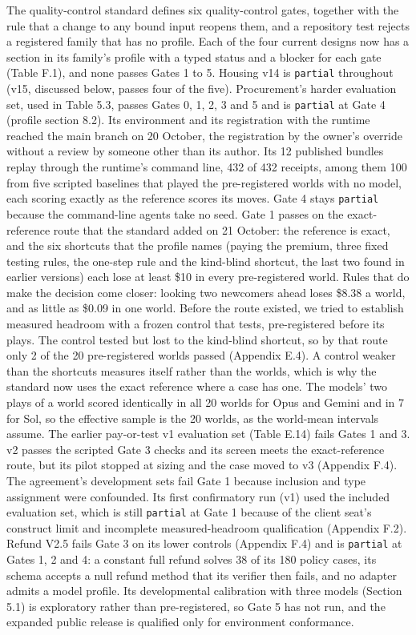 \begin{sloppypar}
The quality-control standard defines six quality-control gates, together with the rule that a change to any bound
input reopens them, and a repository test rejects a registered family that has no profile. Each of the four current
designs now has a section in its family's profile with a typed status and a blocker for each gate (Table F.1), and
none passes Gates 1 to 5. Housing v14 is \texttt{partial} throughout (v15, discussed below, passes four of the five).
Procurement's harder evaluation set, used in Table 5.3, passes Gates 0, 1, 2, 3 and 5 and is \texttt{partial} at Gate 4
(profile section 8.2). Its environment and its registration with the runtime reached the main branch on 20 October,
the registration by the owner's override without a review by someone other than its author. Its 12 published bundles
replay through the runtime's command line, 432 of 432 receipts, among them 100 from five scripted baselines that
played the pre-registered worlds with no model, each scoring exactly as the reference scores its moves. Gate 4 stays
\texttt{partial} because the command-line agents take no seed. Gate 1 passes on the exact-reference route that the standard
added on 21 October: the reference is exact, and the six shortcuts that the profile names (paying the premium, three
fixed testing rules, the one-step rule and the kind-blind shortcut, the last two found in earlier versions) each lose
at least \$10 in every pre-registered world. Rules that do make the decision come closer: looking two newcomers ahead
loses \$8.38 a world, and as little as \$0.09 in one world. Before the route existed, we tried to establish measured
headroom with a frozen control that tests, pre-registered before its plays. The control tested but lost to the
kind-blind shortcut, so by that route only 2 of the 20 pre-registered worlds passed (Appendix E.4). A control weaker
than the shortcuts measures itself rather than the worlds, which is why the standard now uses the exact reference
where a case has one. The models' two plays of a world scored identically in all 20 worlds for Opus and Gemini and in 7
for Sol, so the effective sample is the 20 worlds, as the world-mean intervals assume. The earlier pay-or-test v1
evaluation set (Table E.14) fails Gates 1 and 3. v2 passes the scripted Gate 3 checks and its screen meets the
exact-reference route, but its pilot stopped at sizing and the case moved to v3 (Appendix F.4). The agreement's
development sets fail Gate 1 because inclusion and type assignment were confounded. Its first confirmatory run (v1)
used the included evaluation set, which is still \texttt{partial} at Gate 1 because of the client seat's construct limit and
incomplete measured-headroom qualification (Appendix F.2). Refund V2.5 fails Gate 3 on its lower controls (Appendix
F.4) and is \texttt{partial} at Gates 1, 2 and 4: a constant full refund solves 38 of its 180 policy cases, its schema accepts
a null refund method that its verifier then fails, and no adapter admits a model profile. Its developmental
calibration with three models (Section 5.1) is exploratory rather than pre-registered, so Gate 5 has not run, and the
expanded public release is qualified only for environment conformance.
\end{sloppypar}

